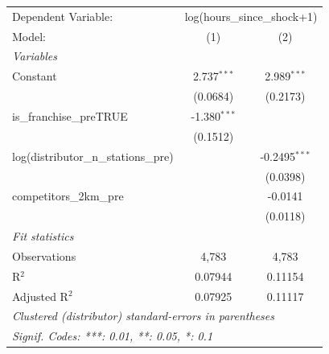 
\begingroup
\centering
\begin{tabular}{lcc}
   \tabularnewline \midrule \midrule
   Dependent Variable: & \multicolumn{2}{c}{log(hours\_since\_shock+1)}\\
   Model:                                & (1)            & (2)\\  
   \midrule
   \emph{Variables}\\
   Constant                              & 2.737$^{***}$  & 2.989$^{***}$\\   
                                         & (0.0684)       & (0.2173)\\   
   is\_franchise\_preTRUE                & -1.380$^{***}$ &   \\   
                                         & (0.1512)       &   \\   
   log(distributor\_n\_stations\_pre)    &                & -0.2495$^{***}$\\   
                                         &                & (0.0398)\\   
   competitors\_2km\_pre                 &                & -0.0141\\   
                                         &                & (0.0118)\\   
   \midrule
   \emph{Fit statistics}\\
   Observations                          & 4,783          & 4,783\\  
   R$^2$                                 & 0.07944        & 0.11154\\  
   Adjusted R$^2$                        & 0.07925        & 0.11117\\  
   \midrule \midrule
   \multicolumn{3}{l}{\emph{Clustered (distributor) standard-errors in parentheses}}\\
   \multicolumn{3}{l}{\emph{Signif. Codes: ***: 0.01, **: 0.05, *: 0.1}}\\
\end{tabular}
\par\endgroup


